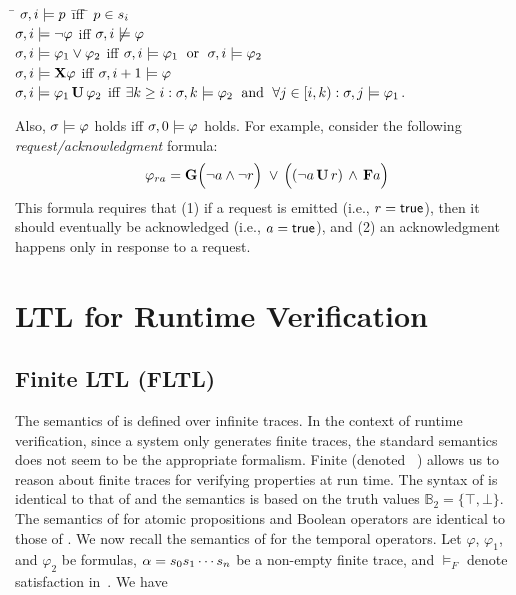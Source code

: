 \begin{tabbing}
\hspace{5mm} \=  $\sigma, i \models p$ \hspace*{2cm} \= iff \hspace*{.5cm} 
\= $p \in s_i$ \\
\> $\sigma, i \models \neg \varphi$ \> iff \> $\sigma,i \not \models 
\varphi$ \\
\> $\sigma, i \models \varphi_1\vee\varphi_2$ \> iff \> $\sigma, i 
\models 
\varphi_1 \; \text{ or } \; \sigma, i \models \varphi_2$ \\
\> $\sigma, i \models \mathbf{X} \varphi$ \> iff \> $\sigma, i+1 \models \varphi$ 
\\
\> $\sigma, i \models \varphi_1 \, \mathbf{U} \, \varphi_2$  \> iff \> $\exists k 
\geq 
i : \sigma, k \models \varphi_2 \; \text{ and } \; \forall j \in [i, k): 
\sigma, j \models \varphi_1$.
\end{tabbing}
Also, $\sigma \models \varphi$ holds \; iff \; $\sigma, 0 
\models \varphi$ holds. For example, consider the following 
\emph{request/acknowledgment} \LTL formula:
$$\varphi_{ra} = \mathbf{G}\Big(\neg a \wedge \neg r\Big) \; \vee \, \Big((\neg a \, \mathbf{U} 
\, r) \, \wedge \, \mathbf{F} a\Big)$$
This formula requires that (1) if a request is emitted (i.e., $r=\mathsf{true}$), 
then it should eventually be acknowledged (i.e., $a=\mathsf{true}$), and (2) an 
acknowledgment happens only in response to a request.

\section{LTL for Runtime Verification}

\subsection{Finite LTL (FLTL)}

The semantics of \LTL is defined over infinite traces. In the context of 
runtime verification, since a system only generates finite traces, the standard 
\LTL semantics does not seem to be the appropriate formalism. Finite \LTL 
(denoted \FLTL~\cite{mp95}) allows us to reason about finite traces for 
verifying properties at run time. The syntax of \FLTL is identical to that of 
\LTL and the semantics is based on the truth values 
$\mathbb{B}_2=\{\top,\bot\}$. The semantics of \FLTL for atomic propositions and 
Boolean operators are identical to those of \LTL. We now recall the semantics of 
\FLTL for the temporal operators. Let $\varphi$, $\varphi_1$, and $\varphi_2$ be 
\LTL formulas, $\alpha = s_0s_1 \cdots s_{n}$ be a non-empty 
finite trace, and $\models_F$ denote satisfaction in~\FLTL. We have

